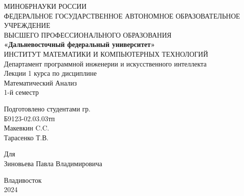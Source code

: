 \documentclass[12pt]{article}
\begin{document}
    \justifying
    \begin{titlepage}
        \begin{center}
            \hfill \break
            \large{МИНОБРНАУКИ РОССИИ}\\
            \footnotesize{ФЕДЕРАЛЬНОЕ ГОСУДАРСТВЕННОЕ АВТОНОМНОЕ ОБРАЗОВАТЕЛЬНОЕ УЧРЕЖДЕНИЕ}\\ 
            \footnotesize{ВЫСШЕГО ПРОФЕССИОНАЛЬНОГО ОБРАЗОВАНИЯ}\\
            \small{\textbf{«Дальневосточный федеральный университет»}}\\
            \hfill \break
            \normalsize{ИНСТИТУТ МАТЕМАТИКИ И КОМПЬЮТЕРНЫХ ТЕХНОЛОГИЙ}\\
             \hfill \break
            \normalsize{Департамент программной инженерии и искусственного интеллекта}\\
            \hfill\break
            \hfill \break
            \hfill \break
            \hfill \break
            \large{Лекции 1 курса по дисциплине}\\
            \large{Математический Анализ}\\
            \large{1-й семестр}\\
            \hfill \break
            \hfill \break
            \hfill \break
            \begin{flushright}
              Подготовлено студентами гр.\\
              Б9123-02.03.03тп\\
              Макевкин C.C.\\
              Тарасенко Т.В.\\
              \hfill \break
            \end{flushright}
            \begin{center}
                Для\\
              Зиновьева Павла Владимировича
            \end{center}
            \hfill \break
            
            \hfill \break
            
            \hfill \break
            \hfill \break
            \end{center}
             
            \hfill \break
             
            \normalsize{ 
            
            }
            \begin{center} Владивосток \\ 2024 \end{center}
            \thispagestyle{empty}
    \end{titlepage}
    \pagebreak
    \tableofcontents
    \pagebreak
\end{document}
